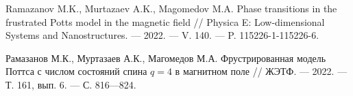 \begin{thebibliography}{111}
  Ramazanov M.K., Murtazaev A.K., Magomedov M.A.
  Phase transitions in the frustrated Potts model in the magnetic field
  //
  Physica E: Low-dimensional Systems and Nanostructures.
  --- 2022.
  --- V. 140.
  --- P. 115226-1-115226-6.
  
  Рамазанов М.К., Муртазаев А.К., Магомедов М.А.
  Фрустрированная модель Поттса с числом состояний спина $q = 4$ в магнитном поле
  //
  ЖЭТФ.
  --- 2022.
  --- Т. 161, вып. 6.
  --- С. 816---824.

\end{thebibliography} 